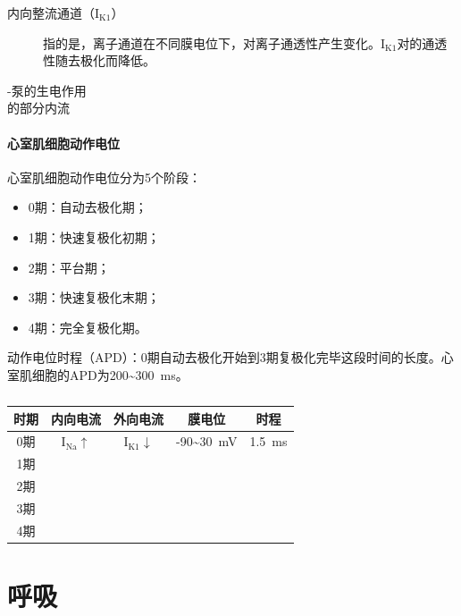 \begin{description}
	\item[内向整流通道（I$_{\text{K1}}$）] 指的是，离子通道在不同膜电位下，对离子通透性产生变化。I$_{\text{K1}}$对的通透性随去极化而降低。
	\item[-泵的生电作用]
	\item[的部分内流]
\end{description}

\paragraph{心室肌细胞动作电位}

心室肌细胞动作电位分为5个阶段：

\begin{itemize}
	\item 0期：自动去极化期；
	\item 1期：快速复极化初期；
	\item 2期：平台期；
	\item 3期：快速复极化末期；
	\item 4期：完全复极化期。
\end{itemize}

动作电位时程（APD）：0期自动去极化开始到3期复极化完毕这段时间的长度。心室肌细胞的APD为200\textasciitilde\SI{300}{\ms}。

\begin{table}[htbp]
	\centering
	\begin{tabularx}{\textwidth}{|c|C|C|c|c|}
		\hline
		时期 & 内向电流 & 外向电流 & 膜电位 & 时程 \\ \hline
		0期 & I$_{\text{Na}}$$\uparrow$ & I$_{\text{K1}}$$\downarrow$ & -90\textasciitilde\SI{+30}{\mV} & \SI{1.5}{\ms} \\ \hline
		1期 &  &  &  &  \\ \hline
		2期 &  &  &  &  \\ \hline
		3期 &  &  &  &  \\ \hline
		4期 &  &  &  &  \\ \hline
	\end{tabularx}
	\caption{}
	\label{tab:my-table}
\end{table}

\section{呼吸}

